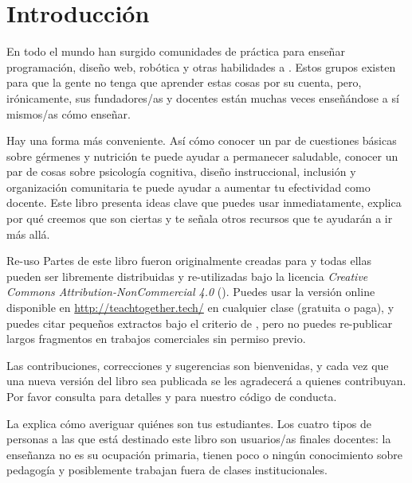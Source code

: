 \chapter{Introducción}\label{s:intro}

En todo el mundo han surgido comunidades de práctica
para enseñar programación, diseño web, robótica y otras habilidades 
a .
Estos grupos existen para que la gente no tenga que aprender estas cosas por su cuenta,
pero, irónicamente,
sus fundadores/as y docentes están muchas veces enseñándose a sí mismos/as cómo enseñar.

Hay una forma más conveniente.
Así cómo conocer un par de cuestiones básicas sobre gérmenes y nutrición te puede ayudar a permanecer saludable,
conocer un par de cosas sobre psicología cognitiva,
diseño instruccional,
inclusión
y organización comunitaria
te puede ayudar a aumentar tu efectividad como docente.
Este libro presenta ideas clave que puedes usar inmediatamente,
explica por qué creemos que son ciertas
y te señala otros recursos que te ayudarán a ir más allá.

\begin{aside}{Re-uso}
Partes de este libro fueron originalmente creadas para
y todas ellas pueden ser libremente distribuidas y re-utilizadas
bajo la licencia \emph{Creative Commons Attribution-NonCommercial 4.0}
 ().
Puedes usar la versión online disponible en \url{http://teachtogether.tech/} 
en cualquier clase
(gratuita o paga),
y puedes citar pequeños extractos bajo el criterio de ,
pero no puedes re-publicar largos fragmentos en trabajos comerciales sin permiso previo.

Las contribuciones, correcciones y sugerencias son bienvenidas,
y cada vez que una nueva versión del libro sea publicada se les agradecerá a quienes contribuyan.
Por favor consulta  para detalles
y  para nuestro código de conducta. 
\end{aside}


La  explica cómo averiguar quiénes son tus estudiantes. Los cuatro tipos de personas a las que está destinado este libro son usuarios/as finales docentes: la enseñanza no es su ocupación primaria, tienen poco o ningún conocimiento sobre pedagogía y posiblemente trabajan fuera de clases institucionales.

